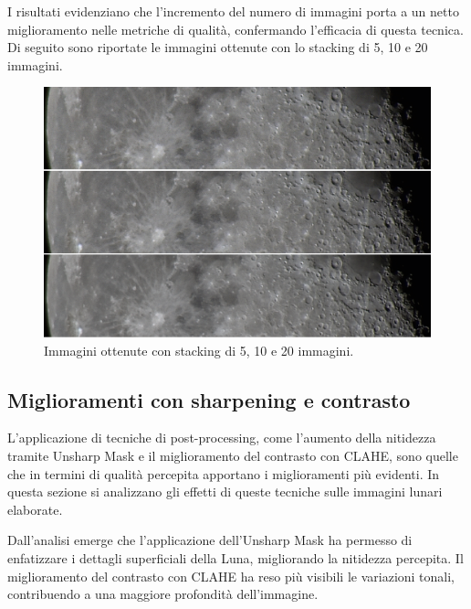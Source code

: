 \begin{figure}[H]
\end{figure}

I risultati evidenziano che l'incremento del numero di immagini porta a un netto miglioramento nelle metriche di qualità, confermando l'efficacia di questa tecnica. Di seguito sono riportate le immagini ottenute con lo stacking di 5, 10 e 20 immagini.

\begin{figure}[H]
    \centering
    \includegraphics[width = \linewidth]{../assets/n_stack_img.png}
    \caption{Immagini ottenute con stacking di 5, 10 e 20 immagini.}
    \label{fig:n_stack_img}
\end{figure}

\subsection{Miglioramenti con sharpening e contrasto} \label{subsec:analysis_post}

L'applicazione di tecniche di post-processing, come l'aumento della nitidezza tramite Unsharp Mask e il miglioramento del contrasto con CLAHE, sono quelle che in termini di qualità percepita apportano i miglioramenti più evidenti. In questa sezione si analizzano gli effetti di queste tecniche sulle immagini lunari elaborate.


Dall'analisi emerge che l'applicazione dell'Unsharp Mask ha permesso di enfatizzare i dettagli superficiali della Luna, migliorando la nitidezza percepita. Il miglioramento del contrasto con CLAHE ha reso più visibili le variazioni tonali, contribuendo a una maggiore profondità dell'immagine.

